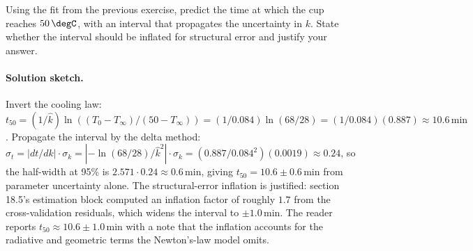 \begin{exercise}
Using the fit from the previous exercise, predict the time at
which the cup reaches $50\,\degC$, with an interval that
propagates the uncertainty in $k$. State whether the interval
should be inflated for structural error and justify your
answer.

\paragraph{Solution sketch.} Invert the cooling law:
$t_{50} = (1/\hat k) \ln((T_{0} - T_{\infty})/(50 - T_{\infty}))
= (1/0.084) \ln(68/28) = (1/0.084)(0.887) \approx 10.6\,\text{min}$.
Propagate the interval by the delta method:
$\sigma_{t} = |dt/dk| \cdot \sigma_{k} = |{-}\ln(68/28) / \hat k^{2}|
\cdot \sigma_{k} = (0.887 / 0.084^{2})(0.0019) \approx 0.24$, so
the half-width at 95\% is $2.571 \cdot 0.24 \approx 0.6\,\text{min}$,
giving $t_{50} = 10.6 \pm 0.6\,\text{min}$ from parameter uncertainty
alone. The structural-error inflation is justified: section 18.5's
estimation block computed an inflation factor of roughly $1.7$ from
the cross-validation residuals, which widens the interval to
$\pm 1.0\,\text{min}$. The reader reports
$t_{50} \approx 10.6 \pm 1.0\,\text{min}$ with a note that the
inflation accounts for the radiative and geometric terms the
Newton's-law model omits.
\end{exercise}

